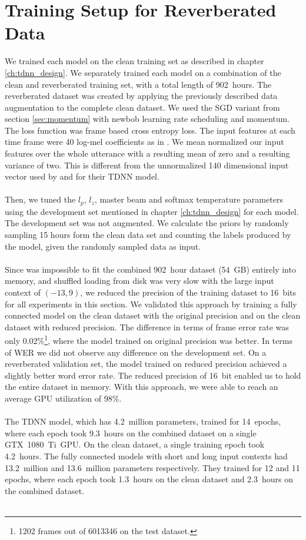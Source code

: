 \section{Training Setup for Reverberated Data}
We trained each model on the clean training set as described in chapter \ref{ch:tdnn_design}. We separately trained each model on a combination of the clean and reverberated training set, with a total length of 902~hours. The reverberated dataset was created by applying the previously described data augmentation to the complete clean dataset. We used the SGD variant from section \ref{sec:momentum} with newbob learning rate scheduling and momentum. The loss function was frame based cross entropy loss. The input features at each time frame were 40 log-mel coefficients as in \cite{nguyen20162016}. We mean normalized our input features over the whole utterance with a resulting mean of zero and a resulting variance of two. This is different from the unnormalized 140 dimensional input vector used by \cite{peddinti2015reverberation} and \cite{peddinti2015jhu} for their TDNN model.\\ \\
Then, we tuned the $l_p$, $l_z$, master beam and softmax temperature parameters using the development set mentioned in chapter \ref{ch:tdnn_design} for each model. The development set was not augmented. We calculate the priors by randomly sampling 15 hours form the clean data set and counting the labels produced by the model, given the randomly sampled data as input. \\ \\ 
Since was impossible to fit the combined 902~hour dataset (54~GB) entirely into memory, and shuffled loading from disk was very slow with the large input context of $(-13, 9)$, we reduced the precision of the training dataset to 16~bits for all experiments in this section. We validated this approach by training a fully connected model on the clean dataset with the original precision and on the clean dataset with reduced precision. The difference in terms of frame error rate was only 0.02\%\footnote{1202 frames out of 6013346 on the test dataset.}, where the model trained on original precision was better. In terms of WER we did not observe any difference on the development set. On a reverberated validation set, the model trained on reduced precision achieved a slightly better word error rate. The reduced precision of 16~bit enabled us to hold the entire dataset in memory. With this approach, we were able to reach an average GPU utilization of 98\%. \\ \\
The TDNN model, which has 4.2~million parameters, trained for 14~epochs, where each epoch took 9.3~hours on the combined dataset on a single GTX~1080~Ti~GPU. On the clean dataset, a single training epoch took 4.2~hours. The fully connected models with short and long input contexts had 13.2~million and 13.6~million parameters respectively. They trained for 12 and 11 epochs, where each epoch took 1.3~hours on the clean dataset and 2.3~hours on the combined dataset. \\ \\
